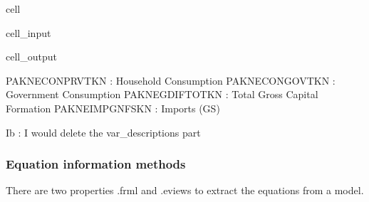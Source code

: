 \documentclass[letterpaper,10pt,english]{jupyterBook}
\begin{document}
\begin{sphinxuseclass}{cell}\begin{sphinxVerbatimInput}

\begin{sphinxuseclass}{cell_input}
\begin{sphinxVerbatim}[commandchars=\\\{\}]
\PYG{p}{[}\PYG{p}{]}
\PYG{p}{[}\PYG{p}{]}
\end{sphinxVerbatim}

\end{sphinxuseclass}\end{sphinxVerbatimInput}
\begin{sphinxVerbatimOutput}

\begin{sphinxuseclass}{cell_output}
\begin{sphinxVerbatim}[commandchars=\\\{\}]
PAKNECONPRVTKN : Household Consumption
PAKNECONGOVTKN : Government Consumption
PAKNEGDIFTOTKN : Total Gross Capital Formation
PAKNEIMPGNFSKN : Imports (G\PYGZam{}S)
\end{sphinxVerbatim}

\end{sphinxuseclass}\end{sphinxVerbatimOutput}

\end{sphinxuseclass}
\sphinxAtStartPar
Ib : I would delete the var\_descriptions part  


\subsubsection{Equation information methods}
\label{\detokenize{content/06_WBModels/LoadingWBModel:equation-information-methods}}
\sphinxAtStartPar
There are two properties .frml and .eviews to extract the equations from a model.
\end{document}
